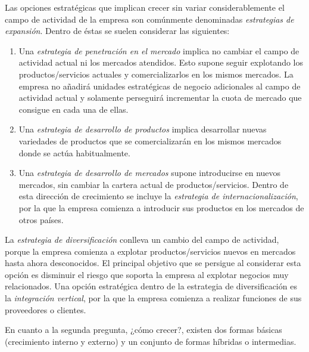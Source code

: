 \documentclass[10pt,a4paper,spanish]{report}
\begin{document}
                        Las opciones estratégicas que implican crecer sin variar considerablemente el campo de actividad de la empresa son comúnmente denominadas \textit{\textcolor[rgb]{0.4,0.9,0.6}{estrategias de expansión}}. Dentro de éstas se suelen considerar las siguientes:
                        \begin{enumerate} [---]
                              \item Una \textit{\textcolor[rgb]{0.4,0.9,0.6}{estrategia de penetración en el mercado}} implica no cambiar el campo de actividad actual ni los mercados atendidos. Esto supone seguir explotando los productos/servicios actuales y comercializarlos en los mismos mercados. La empresa no añadirá unidades estratégicas de negocio adicionales al campo de actividad actual y solamente perseguirá incrementar la cuota de mercado que consigue en cada una de ellas.

                              \item Una \textit{\textcolor[rgb]{0.4,0.9,0.6}{estrategia de desarrollo de productos}} implica desarrollar nuevas variedades de productos que se comercializarán en los mismos mercados donde se actúa habitualmente.

                              \item Una \textit{\textcolor[rgb]{0.4,0.9,0.6}{estrategia de desarrollo de mercados}} supone introducirse en nuevos mercados, sin cambiar la cartera actual de productos/servicios. Dentro de esta dirección de crecimiento se incluye la \textit{\textcolor[rgb]{0.4,0.9,0.6}{estrategia de internacionalización}}, por la que la empresa comienza a introducir sus productos en los mercados de otros países.
                        \end{enumerate}

                        La \textit{\textcolor[rgb]{0.4,0.9,0.6}{estrategia de diversificación}} conlleva un cambio del campo de actividad, porque la empresa comienza a explotar productos/servicios nuevos en mercados hasta ahora desconocidos. El principal objetivo que se persigue al considerar esta opción es disminuir el riesgo que soporta la empresa al explotar negocios muy relacionados. Una opción estratégica dentro de la estrategia de diversificación es la \textit{\textcolor[rgb]{0.4,0.9,0.6}{integración vertical}}, por la  que la empresa comienza a realizar funciones de sus proveedores o clientes.

                        En cuanto a la segunda pregunta, ¿cómo crecer?, existen dos formas básicas (crecimiento interno y externo) y un conjunto de formas híbridas o intermedias.
\end{document}
